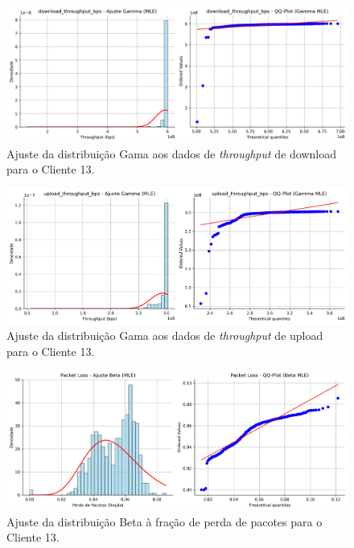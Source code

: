 \documentclass{article}
\begin{document}
\begin{figure}[htp]
	\includegraphics[width=\textwidth]{../figures/mle/download_throughput_bps_ajuste_gamma_client13.png}
	\caption{Ajuste da distribuição Gama aos dados de \textit{throughput} de download para o Cliente 13.}
	\label{fig:download_throughput_bps_ajuste_gamma_client13}
\end{figure}

\begin{figure}[htp]
	\includegraphics[width=\textwidth]{../figures/mle/upload_throughput_bps_ajuste_gamma_client13.png}
	\caption{Ajuste da distribuição Gama aos dados de \textit{throughput} de upload para o Cliente 13.}
	\label{fig:upload_throughput_bps_ajuste_gamma_client13}
\end{figure}

\begin{figure}[htp]
	\includegraphics[width=\textwidth]{../figures/mle/packet_loss_ajuste_beta_client13.png}
	\caption{Ajuste da distribuição Beta à fração de perda de pacotes para o Cliente 13.}
	\label{fig:packet_loss_ajuste_beta_client13}
\end{figure}
\end{document}
